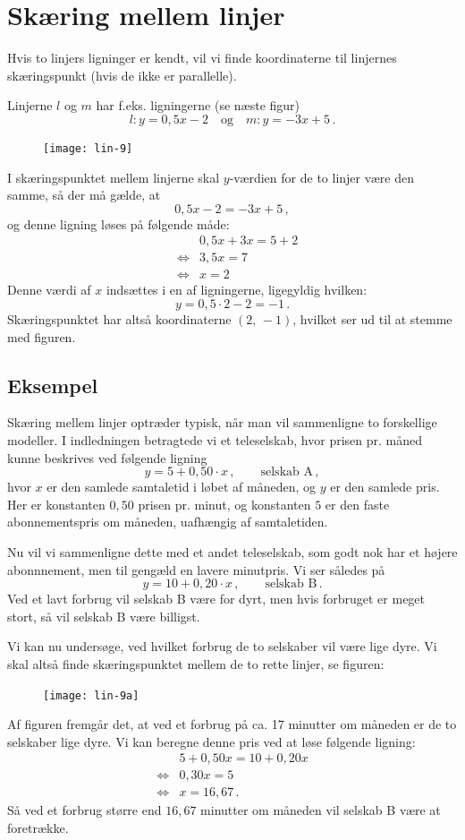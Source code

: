 \documentclass[12pt,oneside,a4paper]{article}
\newcommand{\bas}{\begin{eqnarray*}}
\newcommand{\eas}{\end{eqnarray*}}
\begin{document}

\section{Skæring mellem linjer}
Hvis to linjers ligninger er kendt, vil vi finde koordinaterne til linjernes
skæringspunkt (hvis de ikke er parallelle).

Linjerne $l$ og $m$ har f.eks. ligningerne (se næste figur)
\[
    l: y=0,5x-2\quad{\mbox{og}}\quad m: y=-3x+5 \,.
\]

\begin{figure}[H]
    \centering
    \texttt{[image: lin-9]}
    \caption{}
\end{figure}

I skæringspunktet mellem linjerne skal $y$-værdien for de to linjer være den
samme, så der må gælde, at
\[
0,5x-2 = -3x+5 \,,
\]
og denne ligning løses på følgende måde:
\bas
&& 0,5x+3x=5+2\\
&\iff& 3,5x=7\\
&\iff& x=2
\eas
Denne værdi af $x$ indsættes i en af ligningerne, ligegyldig hvilken:
\[
y=0,5\cdot2-2=-1 \,.
\]
Skæringspunktet har altså koordinaterne $(2,\,-1)$, hvilket ser ud til at
stemme med figuren.

\subsection{Eksempel}
Skæring mellem linjer optræder typisk, når man vil sammenligne to forskellige
modeller.  I indledningen betragtede vi et teleselskab, hvor prisen pr. måned
kunne beskrives ved følgende ligning
\[
    y = 5 + 0,50 \cdot x \,, \quad \quad \mbox{selskab A}\,,
\]
hvor $x$ er den samlede samtaletid i løbet af måneden, og $y$ er den samlede
pris. Her er konstanten $0,50$ prisen pr. minut, og konstanten $5$ er den faste
abonnementspris om måneden, uafhængig af samtaletiden.

Nu vil vi sammenligne dette med et andet teleselskab, som godt nok har et højere abonnnement,
men til gengæld en lavere minutpris. Vi ser således på
\[
    y = 10 + 0,20 \cdot x \,, \quad \quad \mbox{selskab B}\,.
\]
Ved et lavt forbrug vil selskab B være for dyrt, men hvis forbruget er meget stort, så vil
selskab B være billigst.

Vi kan nu undersøge, ved hvilket forbrug de to selskaber vil være lige dyre. Vi skal 
altså finde skæringspunktet mellem de to rette linjer, se figuren:
\begin{figure}[H]
    \centering
    \texttt{[image: lin-9a]}
    \caption{}
\end{figure}
Af figuren fremgår det, at ved et forbrug på ca. 17 minutter om måneden er de
to selskaber lige dyre. Vi kan beregne denne pris ved at løse følgende ligning:
\[
\begin{aligned}
    & 5 + 0,50 x = 10 + 0,20 x \\
    \iff & 0,30x = 5 \\
    \iff & x = 16,67 \,.
\end{aligned}
\]
Så ved et forbrug større end $16,67$ minutter om måneden vil selskab B være at
foretrække.
\end{document}
